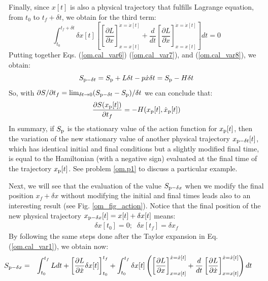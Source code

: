 \documentclass[nofootinbib, secnumarabic, amsmath, nobibnotes,10pt,aps,pra]{revtex4-1}
\newcommand{\fref}[1]{Fig. \ref{#1}}
\newcommand{\eref}[1]{Eq. (\ref{#1})}
\begin{document}
Finally, since $x[t]$ is also a physical trajectory that fulfills
Lagrange equation, 
 from  $t_0$ to $t_f +
\delta t$, we obtain for the third term:
\begin{equation}
\label{om.cal_var8}
\int_{t_0}^{t_f + \delta t} \delta x[t] \left[ \left[ \frac {\partial L} {\partial x} \right]_{x = x[t]}^{\dot{x} = \dot{x}[t]} + \frac {d} {dt} \left[ \frac {\partial L} {\partial \dot{x}} \right]_{x = x[t]}^{\dot{x} = \dot{x}[t]} \right]dt = 0
\end{equation}
Putting together Eqs. (\ref{om.cal_var6}) (\ref{om.cal_var7}), and (\ref{om.cal_var8}), we obtain:
\begin{equation}
\label{om.cal_var9}
 S_{{\rm p} - \delta t} = S_{\rm p} + L \delta t - p \dot{x} \delta t = S_{\rm p} - H \delta t
\end{equation}
So, with ${\partial S}/{\partial t_f} = \lim_{\delta t \rightarrow 0}(S_{{\rm p} - \delta t} - S_{\rm p})/\delta t$ we can conclude that:
\begin{equation}
\label{om.HJ1}
\frac{\partial S(x_{\rm p}[t])} {\partial t_f} = -H(x_{\rm p}[t],\dot{x}_{\rm p}[t])
\end{equation}
In summary, if $S_{\rm p}$ is the stationary value of the action function for $x_{\rm p}[t]$, then the variation of the new stationary value of another physical trajectory $x_{{\rm p} - \delta t}[t]$, which has identical initial and final conditions but a slightly modified final time, is equal to the Hamiltonian (with a negative sign) evaluated at the final time of the trajectory $x_{\rm p}[t]$. See problem \ref{om.p1} to discuss a particular example.

Next, we will see that the evaluation of the value $S_{{\rm p} - \delta x}$ when we modify the final position $x_f + \delta x$ without modifying the initial and final times leads also to an interesting result (see \fref{om_fig_action}). Notice that the final position of the new physical trajectory $x_{{\rm p} - \delta x}[t] = x[t] + \delta x[t]$ means:
\begin{eqnarray}
\label{om.cal_var10}
\delta x[t_0] = 0  ; \; \; \delta x[t_f] = \delta x_f
\end{eqnarray}
By following the same steps done after the Taylor expansion in \eref{om.cal_var1}, we obtain now:
\begin{eqnarray}
\label{om.cal_var11}
\hspace*{-24pt}S_{{\rm p} - \delta x} &=& \int_{t_0}^{t_f} L dt + \left[ \frac
 {\partial L} {\partial \dot{x}} \delta x[t] \right]_{t_0}^{t_f} + \int_{t_0}^{t_f} \delta x[t] \left(\left[ \frac {\partial L} {\partial x} \right]_{x = x[t]}^{\dot{x} = \dot{x}[t]} + \frac {d} {dt} \left[ \frac {\partial L} {\partial \dot{x}} \right]_{x = x[t]}^{\dot{x} = \dot{x}[t]} \right) dt
\end{eqnarray}\vspace*{-12pt}
\end{document}
